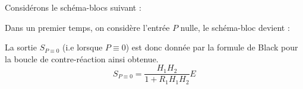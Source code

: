 Considérons le schéma-blocs suivant :
\begin{center}                                                                                                                
\end{center}                                                                                                                  

Dans un premier temps, on considère l'entrée $P$ nulle, le schéma-bloc devient :
\begin{center}                                                                                                                
\end{center}                                                                                                                  
La sortie $S_{P\equiv 0}$ (i.e lorsque $P\equiv0$) est donc donnée 
par la formule de Black pour la boucle de contre-réaction ainsi obtenue.
$$
S_{P\equiv 0}=\dfrac{H_1H_2}{1+R_1H_1H_2} E
$$

